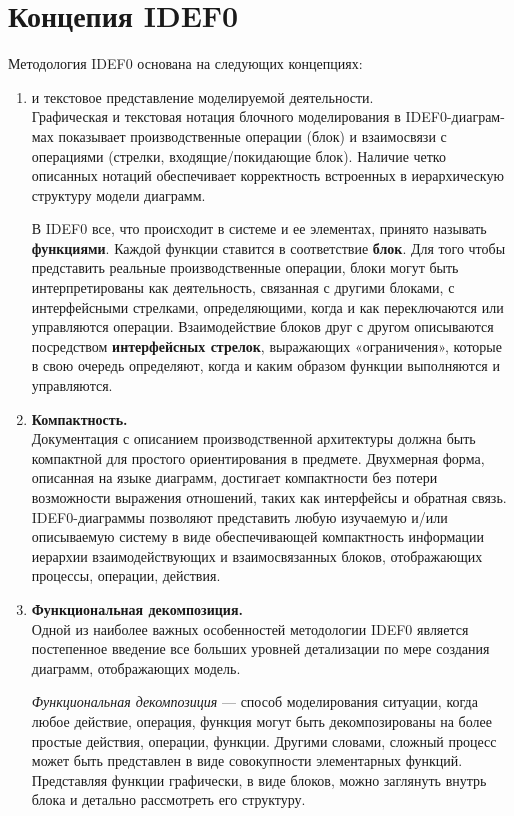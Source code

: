 \documentclass[a4paper, final]{article}
\begin{document}
\section{Концепия IDEF0}
Методология IDEF0 основана на следующих концепциях:
\begin{enumerate}
	\item { и текстовое представление моделируемой деятельности.} \\
Графическая и текстовая нотация блочного моделирования в IDEF0-диаграм-мах показывает производственные операции 
(блок) и взаимосвязи с операциями (стрелки, входящие/покидающие блок). Наличие четко описанных нотаций обеспечивает 
корректность встроенных в иерархическую структуру модели диаграмм.

В IDEF0 все, что происходит в системе и ее элементах, принято называть {\bf функциями}. Каждой функции ставится в соответствие {\bf блок}. 
Для того чтобы представить реальные производственные операции, блоки могут быть интерпретированы как деятельность, связанная с другими блоками, 
с интерфейсными стрелками, определяющими, когда и как переключаются или управляются операции. Взаимодействие блоков друг с другом описываются 
посредством {\bf интерфейсных стрелок}, выражающих «ограничения», которые в свою очередь определяют, когда и каким образом функции выполняются и 
управляются.

	\item {\bf Компактность.} \\
Документация с описанием производственной архитектуры должна быть компактной для простого ориентирования в 
предмете. Двухмерная форма, описанная на языке диаграмм, достигает компактности без потери возможности выражения 
отношений, таких как интерфейсы и обратная связь. IDEF0-диаграммы позволяют представить любую изучаемую и/или 
описываемую систему в виде обеспечивающей компактность информации иерархии взаимодействующих и взаимосвязанных 
блоков, отображающих процессы, операции, действия.

	\item {\bf Функциональная декомпозиция.} \\
Одной из наиболее важных особенностей методологии IDEF0 является постепенное введение все больших 
уровней детализации по мере создания диаграмм, отображающих модель.

{\it Функциональная декомпозиция} --- способ моделирования ситуации, когда любое действие, операция, 
функция могут быть декомпозированы на более простые действия, операции, функции. Другими словами, сложный 
процесс может быть представлен в виде совокупности элементарных функций. Представляя функции графически, в 
виде блоков, можно заглянуть внутрь блока и детально рассмотреть его структуру.


\end{enumerate}
\end{document}

